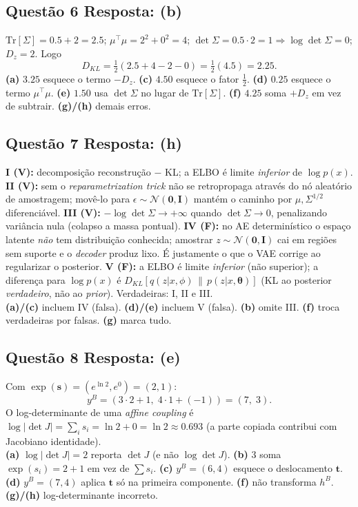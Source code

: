 \documentclass[11pt,a4paper]{article}
\newcommand{\thetav}{\boldsymbol{\theta}}
\begin{document}
\subsection*{Questão 6 \textemdash{} Resposta: (b)}
$\mathrm{Tr}[\Sigma] = 0.5 + 2 = 2.5$; \quad $\mu^{\top}\mu = 2^2 + 0^2 = 4$; \quad $\det\Sigma = 0.5\cdot 2 = 1 \Rightarrow \log\det\Sigma = 0$; \quad $D_z = 2$. Logo
\[
D_{KL} = \tfrac{1}{2}(2.5 + 4 - 2 - 0) = \tfrac{1}{2}(4.5) = 2.25.
\]
\textbf{(a)} $3.25$ esquece o termo $-D_z$.
\textbf{(c)} $4.50$ esquece o fator $\tfrac{1}{2}$.
\textbf{(d)} $0.25$ esquece o termo $\mu^{\top}\mu$.
\textbf{(e)} $1.50$ usa $\det\Sigma$ no lugar de $\mathrm{Tr}[\Sigma]$.
\textbf{(f)} $4.25$ soma $+D_z$ em vez de subtrair.
\textbf{(g)/(h)} demais erros.

\subsection*{Questão 7 \textemdash{} Resposta: (h)}
\textbf{I (V):} decomposição reconstrução $-$ KL; a ELBO é limite \emph{inferior} de $\log p(x)$.
\textbf{II (V):} sem o \textit{reparametrization trick} não se retropropaga através do nó aleatório de amostragem; movê-lo para $\epsilon \sim \mathcal{N}(\mathbf{0},\mathbf{I})$ mantém o caminho por $\mu, \Sigma^{1/2}$ diferenciável.
\textbf{III (V):} $-\log\det\Sigma \to +\infty$ quando $\det\Sigma \to 0$, penalizando variância nula (colapso a massa pontual).
\textbf{IV (F):} no AE determinístico o espaço latente \emph{não} tem distribuição conhecida; amostrar $z\sim\mathcal{N}(\mathbf{0},\mathbf{I})$ cai em regiões sem suporte e o \textit{decoder} produz lixo. É justamente o que o VAE corrige ao regularizar o posterior.
\textbf{V (F):} a ELBO é limite \emph{inferior} (não superior); a diferença para $\log p(x)$ é $D_{KL}[q(z|x,\phi)\,\|\,p(z|x,\thetav)]$ (KL ao posterior \emph{verdadeiro}, não ao \textit{prior}).
Verdadeiras: I, II e III.\\
\textbf{(a)/(c)} incluem IV (falsa).
\textbf{(d)/(e)} incluem V (falsa).
\textbf{(b)} omite III.
\textbf{(f)} troca verdadeiras por falsas.
\textbf{(g)} marca tudo.

\subsection*{Questão 8 \textemdash{} Resposta: (e)}
Com $\exp(\mathbf{s}) = (e^{\ln 2}, e^{0}) = (2, 1)$:
\[
y^B = (3\cdot 2 + 1,\; 4\cdot 1 + (-1)) = (7,\; 3).
\]
O log-determinante de uma \textit{affine coupling} é $\log\lvert\det J\rvert = \sum_i s_i = \ln 2 + 0 = \ln 2 \approx 0.693$ (a parte copiada contribui com Jacobiano identidade).\\
\textbf{(a)} $\log\lvert\det J\rvert = 2$ reporta $\det J$ (e não $\log\det J$).
\textbf{(b)} $3$ soma $\exp(s_i) = 2 + 1$ em vez de $\sum s_i$.
\textbf{(c)} $y^B = (6,4)$ esquece o deslocamento $\mathbf{t}$.
\textbf{(d)} $y^B = (7,4)$ aplica $\mathbf{t}$ só na primeira componente.
\textbf{(f)} não transforma $h^B$.
\textbf{(g)/(h)} log-determinante incorreto.
\end{document}
